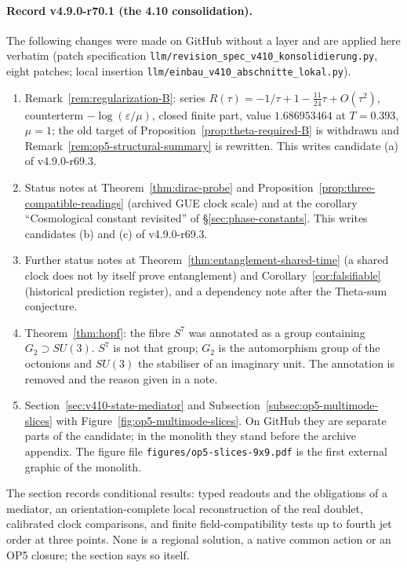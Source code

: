 \paragraph{Record v4.9.0-r70.1 (the 4.10 consolidation).}
The following changes were made on GitHub without a layer and are applied here verbatim (patch specification
\texttt{llm/revision\_spec\_v410\_konsolidierung.py}, eight patches; local insertion \texttt{llm/einbau\_v410\_abschnitte\_lokal.py}).
\begin{enumerate}[leftmargin=2em]
\item[(a)] Remark~\ref{rem:regularization-B}: series \(R(\tau)=-1/\tau+1-\tfrac{11}{24}\tau+O(\tau^2)\), counterterm \(-\log(\varepsilon/\mu)\), closed
finite part, value \(1.686953464\) at \(T=0.393\), \(\mu=1\); the old target of Proposition~\ref{prop:theta-required-B} is withdrawn and
Remark~\ref{rem:op5-structural-summary} is rewritten.  This writes candidate (a) of v4.9.0-r69.3.
\item[(b)] Status notes at Theorem~\ref{thm:dirac-probe} and Proposition~\ref{prop:three-compatible-readings} (archived GUE clock scale) and at the
corollary ``Cosmological constant revisited'' of \S\ref{sec:phase-constants}.  This writes candidates (b) and (c) of v4.9.0-r69.3.
\item[(c)] Further status notes at Theorem~\ref{thm:entanglement-shared-time} (a shared clock does not by itself prove entanglement) and
Corollary~\ref{cor:falsifiable} (historical prediction register), and a dependency note after the Theta-sum conjecture.
\item[(d)] Theorem~\ref{thm:hopf}: the fibre \(S^7\) was annotated as a group containing \(G_2\supset SU(3)\).  \(S^7\) is not that group; \(G_2\) is the
automorphism group of the octonions and \(SU(3)\) the stabiliser of an imaginary unit.  The annotation is removed and the reason given in a note.
\item[(e)] Section~\ref{sec:v410-state-mediator} and Subsection~\ref{subsec:op5-multimode-slices} with Figure~\ref{fig:op5-multimode-slices}.  On GitHub they
are separate parts of the candidate; in the monolith they stand before the archive appendix.  The figure file \texttt{figures/op5-slices-9x9.pdf} is the
first external graphic of the monolith.
\end{enumerate}
The section records conditional results: typed readouts and the obligations of a mediator, an orientation-complete local reconstruction of the
real doublet, calibrated clock comparisons, and finite field-compatibility tests up to fourth jet order at three points.  None is a regional
solution, a native common action or an OP5 closure; the section says so itself.


